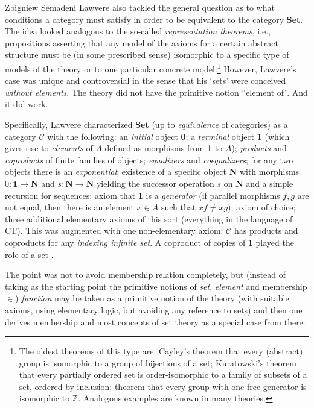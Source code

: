 \begin{artengenv}{Zbigniew Semadeni}
Lawvere also tackled the general question as to what conditions a category 
must satisfy in order to be equivalent to the category \textbf{Set}. The idea looked 
analogous to the so-called \textit{representation theorems}, i.e., propositions 
asserting that any model of the axioms for a certain abstract structure must be 
(in some prescribed sense) isomorphic to a specific type of models of the theory 
or to one particular concrete model.\footnote{The oldest theorems of this type 
are: Cayley's theorem that every (abstract) group is isomorphic to a group of 
bijections of a set; Kuratowski's theorem that every partially ordered set is  
order-isomorphic to a family of subsets of a set, ordered by inclusion; theorem that 
every group with one free generator is isomorphic to $\mathbb{Z}$. 
Analogous examples are known in many theories.} %
However, Lawvere's case was unique and controversial in the sense that his `sets' 
were conceived \textit{without elements}. The theory did not have the primitive 
notion ``element of''. And it did work. 

Specifically, Lawvere characterized \textbf{Set} (up to \textit{equivalence} of 
categories) as a category $\mathcal{C}$ with the following: an \textit{initial} 
object \textbf{0}; a \textit{terminal} object \textbf{1} (which gives rise to 
\textit{elements} of $A$ defined as morphisms from \textbf{1} to $A$); 
\textit{products} and \textit{coproducts} of finite families of objects; 
\textit{equalizers} and \textit{coequalizers}; for any two objects there is an 
\textit{exponential}; existence of a specific object \textbf{N} with morphisms 
$0\colon \mathbf{1} \to \mathbf{N}$ and $s\colon \mathbf{N}\to \mathbf{N}$ yielding 
the successor operation $s$ on $\mathbf{N}$ and a simple recursion for sequences; 
axiom that \textbf{1} is a \textit{generator} (if parallel morphisms $f, g$ are not 
equal, then there is an element $x\in A$ such that $xf\ne xg$); axiom of choice; 
three additional elementary axioms of this sort (everything in the language of CT). 
This was augmented with one non-elementary axiom: $\mathcal{C}$ has products and 
coproducts for any \textit{indexing infinite set}. A coproduct of copies of 
\textbf{1} played the role of a set \parencites[]{Law-Sets}[][pp.386--407]{Form}[][pp.341--345]{Century}.  

The point was not to avoid membership relation completely, but (instead of 
taking as the starting point the primitive notions of \textit{set}, 
\textit{element} and membership $\in $) \textit{function} may be taken as a primitive 
notion of the theory (with suitable axioms, using elementary logic, but avoiding any 
reference to sets) and then one derives membership and most concepts of set theory 
as a special case from there. 


\end{artengenv}

